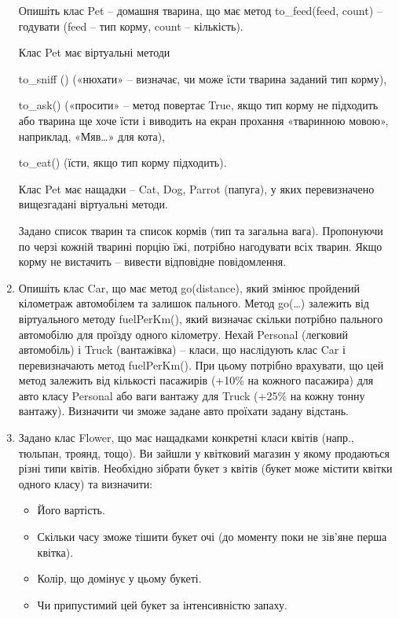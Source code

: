 \documentclass[]{article}
\begin{document}
\begin{enumerate}
Опишіть клас Pet -- домашня тварина, що має метод to\_feed(feed, count)
-- годувати (feed -- тип корму, count -- кількість).

Клас Pet має віртуальні методи

to\_sniff () («нюхати» -- визначає, чи може їсти тварина заданий тип
корму),

to\_ask() («просити» -- метод повертає True, якщо тип корму не підходить
або тварина ще хоче їсти і виводить на екран прохання «тваринною мовою»,
наприклад, «Мяв\ldots{}» для кота),

to\_eat() (їсти, якщо тип корму підходить).

Клас Pet має нащадки -- Cat, Dog, Parrot (папуга), у яких перевизначено
вищезгадані віртуальні методи.

Задано список тварин та список кормів (тип та загальна вага). Пропонуючи
по черзі кожній тварині порцію їжі, потрібно нагодувати всіх тварин.
Якщо корму не вистачить -- вивести відповідне повідомлення.

\item
Опишіть клас Car, що має метод go(distance), який змінює пройдений
кілометраж автомобілем та залишок пального. Метод go(\ldots{}) залежить
від віртуального методу fuelPerKm(), який визначає скільки потрібно
пального автомобілю для проїзду одного кілометру. Нехай Personal
(легковий автомобіль) і Truck (вантажівка) -- класи, що наслідують клас
Car і перевизначають метод fuelPerKm(). При цьому потрібно врахувати, що
цей метод залежить від кількості пасажирів (+10\% на кожного пасажира)
для авто класу Personal або ваги вантажу для Truck (+25\% на кожну тонну
вантажу). Визначити чи зможе задане авто проїхати задану відстань.

\item
Задано клас Flower, що має нащадками конкретні класи квітів (напр.,
тюльпан, троянд, тощо). Ви зайшли у квітковий магазин у якому продаються
різні типи квітів. Необхідно зібрати букет з квітів (букет може містити
квітки одного класу) та визначити:
\begin{itemize}
\item
Його вартість.
\item
Скільки часу зможе тішити букет очі (до моменту поки не зів'яне перша
квітка).
\item
Колір, що домінує у цьому букеті.
\item
Чи припустимий цей букет за інтенсивністю запаху.
\end{itemize}
\end{enumerate}
\end{document}

